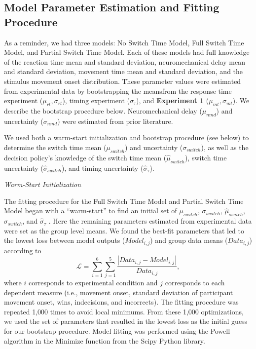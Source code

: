 \documentclass[man,floatsintext,letterpaper,12pt]{apa7}
\newcommand\boldblue[1]{\textcolor{mydarkblue}{\textbf{#1}}}
\begin{document}
\vspace{2mm}
\subsection{Model Parameter Estimation and Fitting Procedure}

\noindent As a reminder, we had three models: No Switch Time Model, Full Switch Time Model, and Partial Switch Time Model. Each of these models had full knowledge of the reaction time mean and standard deviation, neuromechanical delay mean and standard deviation, movement time mean and standard deviation, and the stimulus movement onset distribution. These parameter values were estimated from experimental data by bootstrapping the meansfrom the response time experiment ($\mu_{rt}, \sigma_{rt}$), timing experiment ($\sigma_{\tau}$), and \boldblue{Experiment 1} ($\mu_{mt}, \sigma_{mt}$). We describe the bootstrap procedure below. Neuromechanical delay ($\mu_{nmd}$) and uncertainty ($\sigma_{nmd}$) were estimated from prior literature\autocite{normanElectromechanicalDelaySkeletal1979,rossiniClinicalApplicationsMotor1998,brucePrimateFrontalEye1985}.

We used both a warm-start initialization and bootstrap procedure (see below) to determine the switch time mean ($\mu_{switch}$) and uncertainty ($\sigma_{switch}$), as well as the decision policy’s knowledge of the switch time mean ($\hat{\mu}_{switch}$), switch time uncertainty ($\hat{\sigma}_{switch}$), and timing uncertainty ($\hat{\sigma}_{\tau}$).

\vspace{2mm}
\noindent\emph{Warm-Start Initialization}

\noindent The fitting procedure for the Full Switch Time Model and Partial Switch Time Model began with a “warm-start” to find an initial set of $\mu_{switch}$, $\sigma_{switch}$, $\hat{\mu}_{switch}$, $\hat{\sigma}_{switch}$, and $\hat{\sigma}_{\tau}$ \autocite{rothReinforcementbasedProcessesActively2023,rothPunishmentLeadsGreater2024}.  Here the remaining parameters estimated from experimental data were set as the group level means. We found the best-fit parameters that led to the lowest loss between model outputs ($Model_{i,j}$) and group data means ($Data_{i,j}$) according to
\begin{equation}
    \mathcal{L} = \sum_{i = 1}^{6} \sum_{j = 1}^{5} \frac{|Data_{i,j} - Model_{i,j}|}{Data_{i,j}},
\end{equation}
where $i$ corresponds to experimental condition and $j$ corresponds to each dependent measure (i.e., movement onset, standard deviation of participant movement onset, wins, indecisions, and incorrects). The fitting procedure was repeated 1,000 times to avoid local minimums. From these 1,000 optimizations, we used the set of parameters that resulted in the lowest loss as the initial guess for our bootstrap procedure. Model fitting was performed using the Powell algorithm in the Minimize function from the Scipy Python library.
\end{document}
